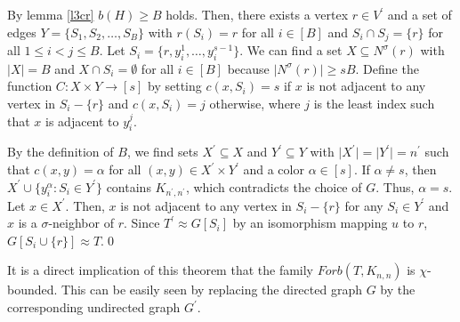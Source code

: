 \begin{prf}
By lemma \ref{l3cr} $b(H)\geq B$ holds. Then, there exists a vertex $r\in V^\prime$ and a set of edges $Y = \{S_1,S_2,\dots ,S_B\}$ with $r(S_i)=r$ for all $i\in [B]$ and $S_i\cap S_j=\{r\}$ for all $1\leq i<j\leq B$. Let $S_i=\{r,y_i^1,\dots ,y_i^{s-1}\}$. We can find a set $X\subseteq N^\sigma (r)$ with $\vert X\vert =B$ and $X\cap S_i =\emptyset$ for all $i\in [B]$ because $\vert N^\sigma (r)\vert\geq sB$. Define the function $C:X\times Y\to [s]$ by setting $c(x,S_i)=s$ if $x$ is not adjacent to any vertex in $S_i-\{r\}$ and $c(x,S_i)=j$ otherwise, where $j$ is the least index such that $x$ is adjacent to $y_i^j$.

By the definition of $B$, we find sets $X^\prime\subseteq X$ and $Y^\prime\subseteq Y$ with $\vert X^\prime\vert = \vert Y^\prime\vert =n^\prime$ such that $c(x,y)=\alpha$ for all $(x,y)\in X^\prime\times Y^\prime$ and a color $\alpha\in [s]$. If $\alpha\neq s$, then $X^\prime\cup\{y_i^\alpha :S_i\in Y^\prime\}$ contains $K_{n^\prime ,n^\prime}$, which contradicts the choice of $G$. Thus, $\alpha = s$. Let $x\in X^\prime$. Then, $x$ is not adjacent to any vertex in $S_i - \{r\}$ for any $S_i\in Y^\prime$ and $x$ is a $\sigma$-neighbor of $r$. Since $T^\prime\approx G[S_i]$ by an isomorphism mapping $u$ to $r$, $G[S_i\cup\{r\}]\approx T$.\qed
\end{prf}

\begin{note}
It is a direct implication of this theorem that the family $\textit{Forb}(T,K_{n,n})$ is $\chi$-bounded. This can be easily seen by replacing the directed graph $G$ by the corresponding undirected graph $G^\prime$.
\end{note}